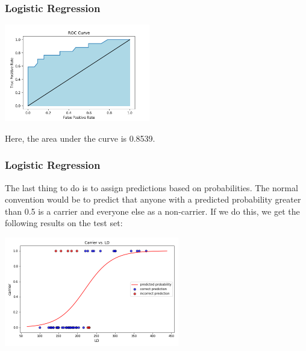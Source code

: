 \documentclass[11pt, table]{beamer}
\begin{document}
\begin{frame}
\frametitle{Logistic Regression}
\begin{center}
	\includegraphics[width = 2.5in]{images/Dystrophy/roc_02.png}
\end{center}

Here, the area under the curve is 0.8539.

\end{frame}

\begin{frame}
\frametitle{Logistic Regression}
The last thing to do is to assign predictions based on probabilities. The normal convention would be to predict that anyone with a predicted probability greater than 0.5 is a carrier and everyone else as a non-carrier. If we do this, we get the following results on the test set:

\begin{center}
	\includegraphics[width = 3in]{images/Dystrophy/scatter_04.png}
\end{center}

\end{frame}
\end{document}
